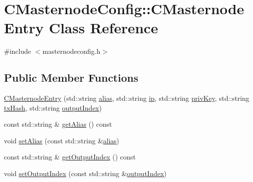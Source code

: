 \hypertarget{class_c_masternode_config_1_1_c_masternode_entry}{}\section{C\+Masternode\+Config\+:\+:C\+Masternode\+Entry Class Reference}
\label{class_c_masternode_config_1_1_c_masternode_entry}


{\ttfamily \#include $<$masternodeconfig.\+h$>$}

\subsection*{Public Member Functions}
\begin{DoxyCompactItemize}
\item 
\mbox{\hyperlink{class_c_masternode_config_1_1_c_masternode_entry_aa393b13586ba87b366559052980bf884}{C\+Masternode\+Entry}} (std\+::string \mbox{\hyperlink{class_c_masternode_config_1_1_c_masternode_entry_a0e584c7d4597037d0a3af60c2c53bbd7}{alias}}, std\+::string \mbox{\hyperlink{class_c_masternode_config_1_1_c_masternode_entry_a16021f21d3621c37eb163dbe0d79fd35}{ip}}, std\+::string \mbox{\hyperlink{class_c_masternode_config_1_1_c_masternode_entry_a431935e8b07bd671ea2ec6bbfb81b689}{priv\+Key}}, std\+::string \mbox{\hyperlink{class_c_masternode_config_1_1_c_masternode_entry_ac739b69566915fe25fd54bafd3129282}{tx\+Hash}}, std\+::string \mbox{\hyperlink{class_c_masternode_config_1_1_c_masternode_entry_ac6eef3b3c5009cd124deba0ce81c6951}{output\+Index}})
\item 
const std\+::string \& \mbox{\hyperlink{class_c_masternode_config_1_1_c_masternode_entry_abf242505d9955e37da0628a35d26677e}{get\+Alias}} () const
\item 
void \mbox{\hyperlink{class_c_masternode_config_1_1_c_masternode_entry_aa74db50dc25069a288266e22867b4537}{set\+Alias}} (const std\+::string \&\mbox{\hyperlink{class_c_masternode_config_1_1_c_masternode_entry_a0e584c7d4597037d0a3af60c2c53bbd7}{alias}})
\item 
const std\+::string \& \mbox{\hyperlink{class_c_masternode_config_1_1_c_masternode_entry_a4aff6625aebbc697706d13fdf044cafa}{get\+Output\+Index}} () const
\item 
void \mbox{\hyperlink{class_c_masternode_config_1_1_c_masternode_entry_a0f4523fe58c95398c9b4cac773a5f39c}{set\+Output\+Index}} (const std\+::string \&\mbox{\hyperlink{class_c_masternode_config_1_1_c_masternode_entry_ac6eef3b3c5009cd124deba0ce81c6951}{output\+Index}})

\end{DoxyCompactItemize}
